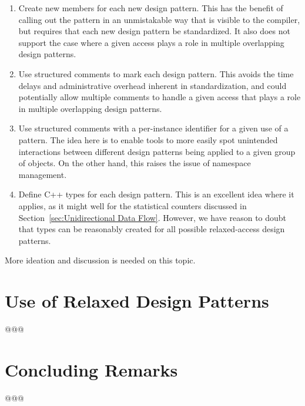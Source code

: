 \documentclass[10]{article}
\begin{document}
\begin{enumerate}
\item	Create new   members for each new
	design pattern.
	This has the benefit of calling out the pattern in an unmistakable
	way that is visible to the compiler, but requires that each
	new design pattern be standardized.
	It also does not support the case where a given access plays a
	role in multiple overlapping design patterns.
\item	Use structured comments to mark each design pattern.
	This avoids the time delays and administrative overhead inherent
	in standardization, and could potentially allow multiple comments
	to handle a given access that plays a role in multiple overlapping
	design patterns.
\item	Use structured comments with a per-instance identifier for
	a given use of a pattern.
	The idea here is to enable tools to more easily spot
	unintended interactions between different design patterns
	being applied to a given group of objects.
	On the other hand, this raises the issue of namespace management.
\item	Define C++  types for each design pattern.
	This is an excellent idea where it applies, as it might well
	for the statistical counters discussed in
	Section~\ref{sec:Unidirectional Data Flow}.
	However, we have reason to doubt that  types can
	be reasonably created for all possible relaxed-access design
	patterns.
\end{enumerate}

More ideation and discussion is needed on this topic.

\section{Use of Relaxed Design Patterns}
\label{sec:Use of Relaxed Design Patterns}

@@@

\section{Concluding Remarks}
\label{sec:Concluding Remarks}

@@@




\end{document}
